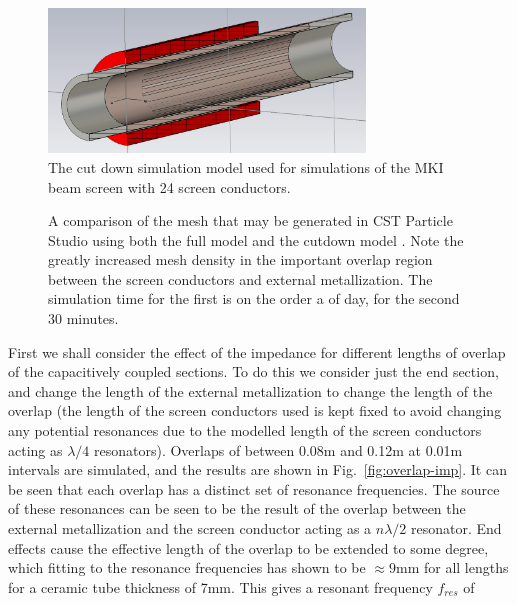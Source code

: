 \begin{figure}
\begin{center}
\includegraphics[width=0.75\textwidth]{LHC_MKI/figures/cutDownModel.png}
\end{center}
\caption{The cut down simulation model used for simulations of the MKI beam screen with 24 screen conductors.}
\label{fig:cut-down-mki-cap-end}
\end{figure}

\begin{figure}
\caption{A comparison of the mesh that may be generated in CST Particle Studio using both the full model  and the cutdown model . Note the greatly increased mesh density in the important overlap region between the screen conductors and external metallization. The simulation time for the first is on the order a of day, for the second 30 minutes.}
\label{fig:mki-mesh-com-cst}
\end{figure}

First we shall consider the effect of the impedance for different lengths of overlap of the capacitively coupled sections. To do this we consider just the end section, and change the length of the external metallization to change the length of the overlap (the length of the screen conductors used is kept fixed to avoid changing any potential resonances due to the modelled length of the screen conductors acting as $\lambda /4$ resonators). Overlaps of between 0.08m and 0.12m at 0.01m intervals are simulated, and the results are shown in Fig.~\ref{fig:overlap-imp}. It can be seen that each overlap has a distinct set of resonance frequencies. The source of these resonances can be seen to be the result of the overlap between the external metallization and the screen conductor acting as a $n \lambda /2$ resonator. End effects cause the effective length of the overlap to be extended to some degree, which fitting to the resonance frequencies has shown to be $\approx 9$mm for all lengths for a ceramic tube thickness of 7mm. This gives a resonant frequency $f_{res}$ of

